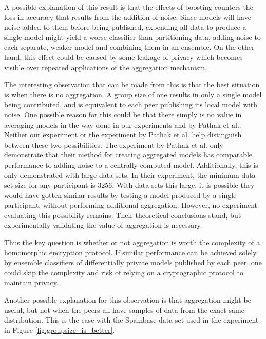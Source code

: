A possible explanation of this result is that the effects of  boosting counters the loss in accuracy that results from the addition of noise. Since models will have noise added to them before being published, expending all data to produce a single model might yield a worse classifier than partitioning data, adding noise to each separate, weaker model and combining them in an ensemble. On the other hand, this effect could be caused by some leakage of privacy which becomes visible over repeated applications of the aggregation mechanism.  

The interesting observation that can be made from this is that the best situation is when there is no aggregation. A group size of one results in only a single model being contributed, and is equivalent to each peer publishing its local model with noise. One possible reason for this could be that there simply is no value in averaging models in the way done in our experiments and by Pathak et al.\cite{pathak2010diffprivhomo}. Neither our experiment or the experiment by Pathak et al. help distinguish between these two possibilities. The experiment by Pathak et al. only demonstrate that their method for creating aggregated models has comparable performance to adding noise to a centrally computed model. Additionally, this is only demonstrated with large data sets. In their experiment, the minimum data set size for any participant is 3256. With data sets this large, it is possible they would have gotten similar results by testing a model produced by a single participant, without performing additional aggregation. However, no experiment evaluating this possibility remains. Their theoretical conclusions stand, but experimentally validating the value of aggregation is necessary.

Thus the key question is whether or not aggregation is worth the complexity of a homomorphic encryption protocol. If similar performance can be achieved solely by ensemble classifiers of differentially private models published by each peer, one could skip the complexity and risk of relying on a cryptographic protocol to maintain privacy.

Another possible explanation for this observation is that aggregation might be useful, but not when the peers all have samples of data from the exact same distribution. This is the case with the Spambase data set used in the experiment in Figure \ref{fig:groupsize_is_better}.

